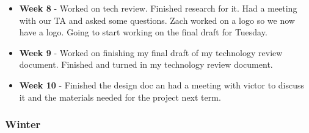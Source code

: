 \documentclass[onecolumn, draftclsnofoot,10pt, compsoc]{IEEEtran}
\begin{document}
\begin{itemize}
					\item \textbf{Week 8} - Worked on tech review. Finished research  for it. Had a meeting with our TA and asked some questions. Zach worked on a logo so we now have a logo.  Going to start working on the final draft for Tuesday.
					\item \textbf{Week 9} - Worked on finishing my final draft of my technology review document. Finished and turned in my technology review document.
					\item \textbf{Week 10} - Finished the design doc an had a meeting with victor to discuss it and the materials needed for the project next term. 
				\end{itemize}
			\subsubsection{Winter}
\end{document}
